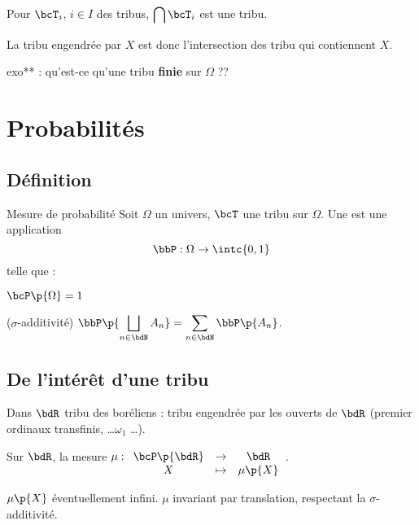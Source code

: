 \documentclass[a4paper,french,bookmarks]{book}
\begin{document}
    \begin{property}{}{}
        Pour $\bcT_i$, $i \in I$ des tribus, $\displaystyle\bigcap \bcT_i$ est une tribu.
    \end{property}
    
    La tribu engendrée par $X$ est donc l'intersection des tribu qui contiennent $X$.
    

    
    exo** : qu'est-ce qu'une tribu \textbf{finie} sur $\Omega$ ??
    
    \section{Probabilités}
    
    \subsection{Définition}
    
    \begin{definition}{Mesure de probabilité}{}
        Soit $\Omega$ un univers, $\bcT$ une tribu sur $\Omega$. Une  est une application 
        \[ \bbP : \Omega \to \intc{0, 1} \]
        telle que :
        \begin{psse}
            \item $\bcP\p{\Omega} = 1$
            
            \item ($\sigma$-additivité) $\displaystyle\bbP\p{\bigsqcup_{n \in \bdN} A_n} = \sum_{n \in \bdN} \bbP\p{A_n}$.
        \end{psse}
    \end{definition}
    
    \subsection{De l'intérêt d'une tribu}
    
    Dans $\bdR$ tribu des boréliens : tribu engendrée par les ouverts de $\bdR$ (\cf premier ordinaux transfinis, \dots $\omega_1$ \dots). 
    
    Sur $\bdR$, la mesure $\mu : \begin{array}[t]{ccc}
        \bcP\p{\bdR} &\to& \bdR  \\
        X &\mapsto& \mu\p{X} 
    \end{array}$.
    
    $\mu\p{X}$ éventuellement infini. $\mu$ invariant par translation, respectant la $\sigma$-additivité.
    
\end{document}
